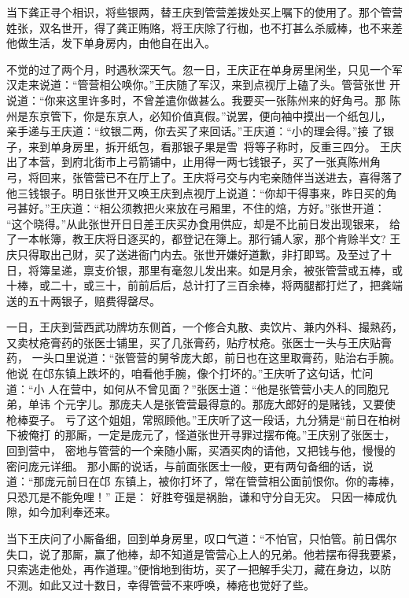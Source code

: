 当下龚正寻个相识，将些银两，替王庆到管营差拨处买上嘱下的使用了。那个管营
姓张，双名世开，得了龚正贿赂，将王庆除了行枷，也不打甚么杀威棒，也不来差
他做生活，发下单身房内，由他自在出入。

不觉的过了两个月，时遇秋深天气。忽一日，王庆正在单身房里闲坐，只见一个军
汉走来说道：“管营相公唤你。”王庆随了军汉，来到点视厅上磕了头。管营张世
开说道：“你来这里许多时，不曾差遣你做甚么。我要买一张陈州来的好角弓。那
陈州是东京管下，你是东京人，必知价值真假。”说罢，便向袖中摸出一个纸包儿，
亲手递与王庆道：“纹银二两，你去买了来回话。”王庆道：“小的理会得。”接
了银子，来到单身房里，拆开纸包，看那银子果是雪，将等子称时，反重三四分。
王庆出了本营，到府北街市上弓箭铺中，止用得一两七钱银子，买了一张真陈州角
弓，将回来，张管营已不在厅上了。王庆将弓交与内宅亲随伴当送进去，喜得落了
他三钱银子。明日张世开又唤王庆到点视厅上说道：“你却干得事来，昨日买的角
弓甚好。”王庆道：“相公须教把火来放在弓厢里，不住的焙，方好。”张世开道：
“这个晓得。”从此张世开日日差王庆买办食用供应，却是不比前日发出现银来，
给了一本帐簿，教王庆将日逐买的，都登记在簿上。那行铺人家，那个肯赊半文?
王庆只得取出己财，买了送进衙门内去。张世开嫌好道歉，非打即骂。及至过了十
日，将簿呈递，禀支价银，那里有毫忽儿发出来。如是月余，被张管营或五棒，或
十棒，或二十，或三十，前前后后，总计打了三百余棒，将两腿都打烂了，把龚端
送的五十两银子，赔费得罄尽。

一日，王庆到营西武功牌坊东侧首，一个修合丸散、卖饮片、兼内外科、撮熟药，
又卖杖疮膏药的张医士铺里，买了几张膏药，贴疗杖疮。张医士一头与王庆贴膏药，
一头口里说道：“张管营的舅爷庞大郎，前日也在这里取膏药，贴治右手腕。他说
在邙东镇上跌坏的，咱看他手腕，像个打坏的。”王庆听了这句话，忙问道：“小
人在营中，如何从不曾见面？”张医士道：“他是张管营小夫人的同胞兄弟，单讳
个元字儿。那庞夫人是张管营最得意的。那庞大郎好的是赌钱，又要使枪棒耍子。
亏了这个姐姐，常照顾他。”王庆听了这一段话，九分猜是“前日在柏树下被俺打
的那厮，一定是庞元了，怪道张世开寻罪过摆布俺。”王庆别了张医士，回到营中，
密地与管营的一个亲随小厮，买酒买肉的请他，又把钱与他，慢慢的密问庞元详细。
那小厮的说话，与前面张医士一般，更有两句备细的话，说道：“那庞元前日在邙
东镇上，被你打坏了，常在管营相公面前恨你。你的毒棒，只恐兀是不能免哩！”
正是：
好胜夸强是祸胎，谦和守分自无灾。
只因一棒成仇隙，如今加利奉还来。

当下王庆问了小厮备细，回到单身房里，叹口气道：“不怕官，只怕管。前日偶尔
失口，说了那厮，赢了他棒，却不知道是管营心上人的兄弟。他若摆布得我要紧，
只索逃走他处，再作道理。”便悄地到街坊，买了一把解手尖刀，藏在身边，以防
不测。如此又过十数日，幸得管营不来呼唤，棒疮也觉好了些。

